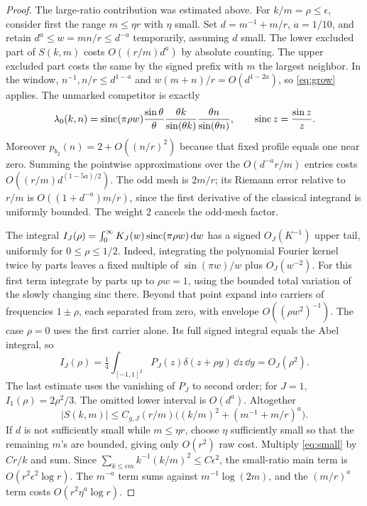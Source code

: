 \begin{proof}
The large-ratio contribution was estimated above. For \(k/m=\rho\le\epsilon\), consider first the range \(m\le\eta r\) with \(\eta\) small. Set \(d=m^{-1}+m/r\), \(a=1/10\), and retain \(d^a\le w=mn/r\le d^{-a}\) temporarily, assuming \(d\) small. The lower excluded part of \(S(k,m)\) costs \(O((r/m)d^a)\) by absolute counting. The upper excluded part costs the same by the signed prefix with \(m\) the largest neighbor. In the window, \(n^{-1},n/r\le d^{1-a}\) and \(w(m+n)/r=O(d^{1-2a})\), so \eqref{eq:grow} applies. The unmarked competitor is exactly
\[
 \lambda_0(k,n)=\operatorname{sinc}(\pi\rho w)
   \frac{\sin\theta}{\theta}
   \frac{\theta k}{\sin(\theta k)}
   \frac{\theta n}{\sin(\theta n)},\qquad \operatorname{sinc} z=\frac{\sin z}{z}.
\]
Moreover \(p_{b_2}(n)=2+O((n/r)^2)\) because that fixed profile equals one near zero. Summing the pointwise approximations over the \(O(d^{-a}r/m)\) entries costs \(O((r/m)d^{(1-5a)/2})\). The odd mesh is \(2m/r\); its Riemann error relative to \(r/m\) is \(O((1+d^{-a})m/r)\), since the first derivative of the classical integrand is uniformly bounded. The weight \(2\) cancels the odd-mesh factor.

The integral \(I_J(\rho)=\int_0^\infty K_J(w)\operatorname{sinc}(\pi\rho w)\,\mathrm d w\) has a signed \(O_J(K^{-1})\) upper tail, uniformly for \(0\le\rho\le1/2\). Indeed, integrating the polynomial Fourier kernel twice by parts leaves a fixed multiple of \(\sin(\pi w)/w\) plus \(O_J(w^{-2})\). For this first term integrate by parts up to \(\rho w=1\), using the bounded total variation of the slowly changing sinc there. Beyond that point expand into carriers of frequencies \(1\pm\rho\), each separated from zero, with envelope \(O((\rho w^2)^{-1})\). The case \(\rho=0\) uses the first carrier alone. Its full signed integral equals the Abel integral, so
\[
 I_J(\rho)=\tfrac14\int_{[-1,1]^2} P_J(z)
                          \delta(z+\rho y)\,\dd z\,\dd y =O_J(\rho^2).
\]
The last estimate uses the vanishing of \(P_J\) to second order; for \(J=1\), \(I_1(\rho)=2\rho^2/3\). The omitted lower interval is \(O(d^a)\). Altogether
\begin{equation}
 |S(k,m)|\le C_{g,J}(r/m)\bigl((k/m)^2+(m^{-1}+m/r)^a\bigr).
 \label{eq:small}
\end{equation}
If \(d\) is not sufficiently small while \(m\le\eta r\), choose \(\eta\) sufficiently small so that the remaining \(m\)'s are bounded, giving only \(O(r^2)\) raw cost. Multiply \eqref{eq:small} by \(Cr/k\) and sum. Since \(\sum_{k\le\epsilon m} k^{-1}(k/m)^2\le C\epsilon^2\), the small-ratio main term is \(O(r^2\epsilon^2\log r)\). The \(m^{-a}\) term sums against \(m^{-1}\log(2m)\), and the \((m/r)^a\) term costs \(O(r^2\eta^a\log r)\).


\end{proof}
